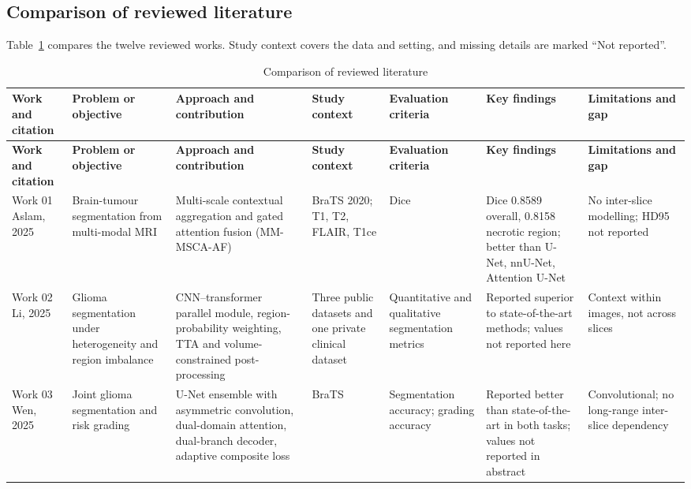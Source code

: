\clearpage\begin{landscape}
\section{Comparison of reviewed literature}
Table~\ref{tab:literature} compares the twelve reviewed works. Study context covers the data and setting, and missing details are marked ``Not reported''.

\begingroup\small\setlength{\tabcolsep}{4pt}\renewcommand{\arraystretch}{1.2}
\begin{longtable}{|p{2.2cm}|p{2.6cm}|p{3.6cm}|p{2.7cm}|p{2.6cm}|p{3.2cm}|p{3.2cm}|}
\caption{Comparison of reviewed literature}\label{tab:literature}\\\hline
\textbf{Work and citation} & \textbf{Problem or objective} & \textbf{Approach and contribution} & \textbf{Study context} & \textbf{Evaluation criteria} & \textbf{Key findings} & \textbf{Limitations and gap}\\\hline\endfirsthead
\textbf{Work and citation} & \textbf{Problem or objective} & \textbf{Approach and contribution} & \textbf{Study context} & \textbf{Evaluation criteria} & \textbf{Key findings} & \textbf{Limitations and gap}\\\hline\endhead
Work 01 \cite{aslam2025} Aslam, 2025 & Brain-tumour segmentation from multi-modal MRI & Multi-scale contextual aggregation and gated attention fusion (MM-MSCA-AF) & BraTS 2020; T1, T2, FLAIR, T1ce & Dice & Dice 0.8589 overall, 0.8158 necrotic region; better than U-Net, nnU-Net, Attention U-Net & No inter-slice modelling; HD95 not reported\\\hline
Work 02 \cite{li2025deepglioseg} Li, 2025 & Glioma segmentation under heterogeneity and region imbalance & CNN--transformer parallel module, region-probability weighting, TTA and volume-constrained post-processing & Three public datasets and one private clinical dataset & Quantitative and qualitative segmentation metrics & Reported superior to state-of-the-art methods; values not reported here & Context within images, not across slices\\\hline
Work 03 \cite{wen2025} Wen, 2025 & Joint glioma segmentation and risk grading & U-Net ensemble with asymmetric convolution, dual-domain attention, dual-branch decoder, adaptive composite loss & BraTS & Segmentation accuracy; grading accuracy & Reported better than state-of-the-art in both tasks; values not reported in abstract & Convolutional; no long-range inter-slice dependency\\\hline

\end{longtable}
\end{landscape}
